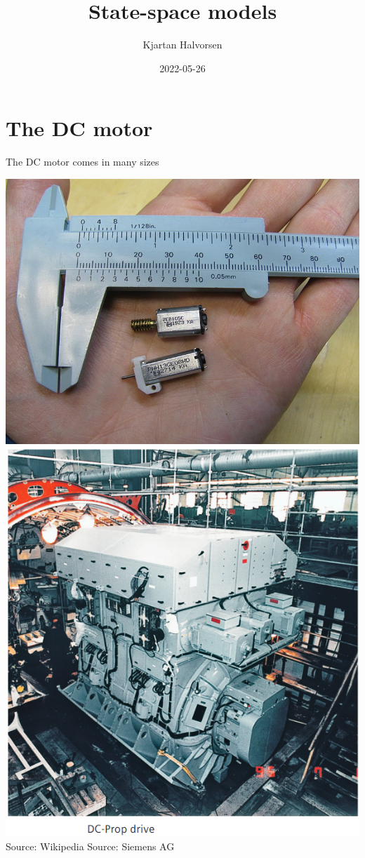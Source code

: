 \documentclass[presentation,aspectratio=169]{beamer}
\author{Kjartan Halvorsen}
\date{2022-05-26}
\title{State-space models}
\begin{document}
\maketitle

\section{The DC motor}
\label{sec:orgdd3ad45}
\begin{frame}[label={sec:org3e5e212}]{The DC motor comes in many sizes}
\begin{center}
\includegraphics[height=0.6\textheight]{../../figures/wiki-small-dc-motor.jpg}
\includegraphics[width=0.6\textheight]{../../figures/Siemens-DC-prop.png}\\
{\footnotesize Source: Wikipedia \hspace*{3cm} Source: Siemens AG}
\end{center}
\end{frame}
\end{document}
